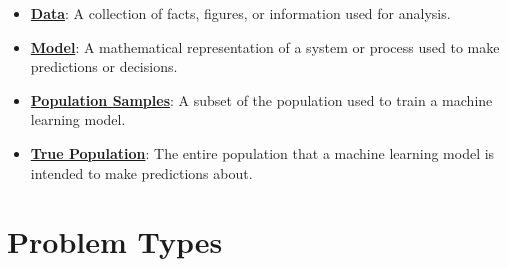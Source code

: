 \documentclass{article}%
\begin{document}
\begin{itemize}[leftmargin=*]
\item \href{https://purdue.brightspace.com/d2l/common/assets/pdfjs-d2l-dist/1.0.14-legacy/web/viewer.html?file=\%2Fcontent\%2Fenforced\%2F1095467-wl.202510.CS.24300.001\%2F16L2-ethics.pdf\%3Fou\%3D1095467\&lang=en-us\&container=d2l-fileviewer-rendered-pdf\&fullscreen=d2l-fileviewer-rendered-pdf-dialog\&height=667#page=3}{\textbf{Data}}: A collection of facts, figures, or information used for analysis.%
\item \href{https://purdue.brightspace.com/d2l/common/assets/pdfjs-d2l-dist/1.0.14-legacy/web/viewer.html?file=\%2Fcontent\%2Fenforced\%2F1095467-wl.202510.CS.24300.001\%2F16L2-ethics.pdf\%3Fou\%3D1095467\&lang=en-us\&container=d2l-fileviewer-rendered-pdf\&fullscreen=d2l-fileviewer-rendered-pdf-dialog\&height=667#page=12}{\textbf{Model}}: A mathematical representation of a system or process used to make predictions or decisions.%
\item \href{https://purdue.brightspace.com/d2l/common/assets/pdfjs-d2l-dist/1.0.14-legacy/web/viewer.html?file=\%2Fcontent\%2Fenforced\%2F1095467-wl.202510.CS.24300.001\%2F16L2-ethics.pdf\%3Fou\%3D1095467\&lang=en-us\&container=d2l-fileviewer-rendered-pdf\&fullscreen=d2l-fileviewer-rendered-pdf-dialog\&height=667#page=22}{\textbf{Population Samples}}: A subset of the population used to train a machine learning model.%
\item \href{https://purdue.brightspace.com/d2l/common/assets/pdfjs-d2l-dist/1.0.14-legacy/web/viewer.html?file=\%2Fcontent\%2Fenforced\%2F1095467-wl.202510.CS.24300.001\%2F16L2-ethics.pdf\%3Fou\%3D1095467\&lang=en-us\&container=d2l-fileviewer-rendered-pdf\&fullscreen=d2l-fileviewer-rendered-pdf-dialog\&height=667#page=22}{\textbf{True Population}}: The entire population that a machine learning model is intended to make predictions about.%
\end{itemize}

%
\section{Problem Types}%
\label{sec:ProblemTypes}%
\end{document}
